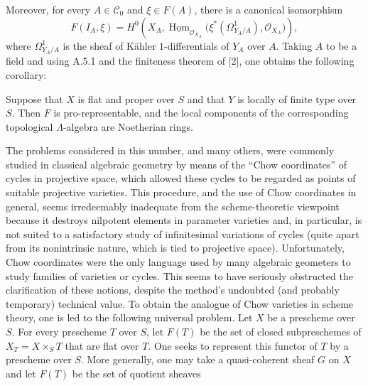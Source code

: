 Moreover, for every $A\in\mathcal C_0$ and $\xi\in F(A)$, there is a canonical
isomorphism
\[
  F(I_A,\xi)=H^0\!\left(
    X_A,
    \underline{\operatorname{Hom}}_{\mathcal O_{X_A}}
    \bigl(\xi^*(\Omega^1_{Y_A/A}),\mathcal O_{X_A}\bigr)
  \right),
\]
where $\Omega^1_{Y_A/A}$ is the sheaf of Kähler $1$-differentials of $Y_A$
over $A$. Taking $A$ to be a field and using A.5.1 and the finiteness theorem
of [2], one obtains the following corollary:

 Suppose that $X$ is flat and proper over $S$ and that $Y$
is locally of finite type over $S$. Then $F$ is pro-representable, and the local
components of the corresponding topological $\Lambda$-algebra are Noetherian
rings.

 The problems considered in this number, and many others,
were commonly studied in classical algebraic geometry by means of the “Chow
coordinates” of cycles in projective space, which allowed these cycles to be
regarded as points of suitable projective varieties. This procedure, and the
use of Chow coordinates in general, seems irredeemably inadequate from the
scheme-theoretic viewpoint because it destroys nilpotent elements in parameter
varieties and, in particular, is not suited to a satisfactory study of
infinitesimal variations of cycles (quite apart from its nonintrinsic nature,
which is tied to projective space). Unfortunately, Chow coordinates were the
only language used by many algebraic geometers to study families of varieties
or cycles. This seems to have seriously obstructed the clarification of these
notions, despite the method's undoubted (and probably temporary) technical
value. To obtain the analogue of Chow varieties in scheme theory, one is led
to the following universal problem. Let $X$ be a prescheme over $S$. For every
prescheme $T$ over $S$, let $F(T)$ be the set of closed subpreschemes of
$X_T=X\times_ST$ that are flat over $T$. One seeks to represent this functor
of $T$ by a prescheme over $S$. More generally, one may take a quasi-coherent
sheaf $G$ on $X$ and let $F(T)$ be the set of quotient sheaves

